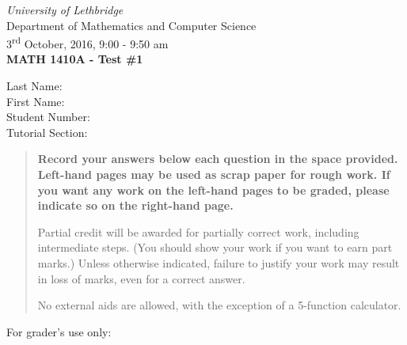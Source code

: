 \documentclass[12pt]{article}
\newcommand{\skipline}{\vspace{12pt}}
\begin{document}
\author{Instructor: Sean Fitzpatrick}
\thispagestyle{plain}
\begin{center}
\emph{University of Lethbridge}\\
Department of Mathematics and Computer Science\\
3\textsuperscript{rd} October, 2016, 9:00 - 9:50 am\\
{\bf MATH 1410A - Test \#1}\\
\end{center}
\skipline \skipline \skipline \noindent \skipline
Last Name:\underline{\hspace{50pt}{\bf Solutions}\hspace{248pt}}\\
\skipline
First Name:\underline{\hspace{50pt}{\bf The}\hspace{275pt}}\\
\skipline
Student Number:\underline{\hspace{323pt}}\\
\skipline
Tutorial Section: \underline{\hspace{320pt}}\\


\vspace{0.5in}


\begin{quote}
 {\bf Record your answers below each question in the space provided.    Left-hand pages may be used as scrap paper for rough work.  If you want any work on the left-hand pages to be graded, please indicate so on the right-hand page.
 
 \bigskip
 
Partial credit will be awarded for partially correct work, including intermediate steps. (You should show your work if you want to earn part marks.) Unless otherwise indicated, failure to justify your work may result in loss of marks, even for a correct answer. 

\bigskip

No external aids are allowed, with the exception of a 5-function calculator.}
\end{quote}


\vspace{0.5in}

For grader's use only:
\end{document}
